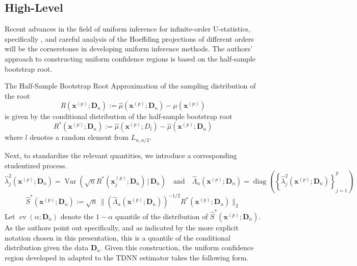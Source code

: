 \documentclass[letterpaper,10pt]{article}
\numberwithin{equation}{section}
\numberwithin{theorem}{section}
\numberwithin{remark}{section}
\numberwithin{example}{section}
\theoremstyle{definition}
\renewcommand{\hat}{\widehat}
\newcommand{\1}{\mathbb{1}}
\begin{document}
\subsection{High-Level}
Recent advances in the field of uniform inference for infinite-order U-statistics, specifically \citet{ritzwoller_uniform_2024}, and careful analysis of the Hoeffding projections of different orders will be the cornerstones in developing uniform inference methods.
The authors' approach to constructing uniform confidence regions is based on the half-sample bootstrap root.

\vspace{0.5cm}
\begin{definition}
	The Half-Sample Bootstrap Root Approximation of the sampling distribution of the root
	\begin{equation}
		R\left(\mathbf{x}^{(p)}; \mathbf{D}_n\right)
		:= \hat{\mu}\left(\mathbf{x}^{(p)}; \mathbf{D}_n\right) - \mu(\mathbf{x}^{(p)})
	\end{equation}
	is given by the conditional distribution of the half-sample bootstrap root
	\begin{equation}
		R^{*}\left(\mathbf{x}^{(p)}; \mathbf{D}_n\right)
		:= \hat{\mu}\left(\mathbf{x}^{(p)}; D_l\right) - \hat{\mu}\left(\mathbf{x}^{(p)}; \mathbf{D}_n\right)
	\end{equation}
	where $l$ denotes a random element from $L_{n, n/2}$.
\end{definition}
Next, to standardize the relevant quantities, we introduce a corresponding studentized process.
\begin{equation}
	\hat{\lambda}_{j}^{2}\left(\mathbf{x}^{(p)}; \mathbf{D}_n\right) = \operatorname{Var}\left(\sqrt{n} R^{*}(\mathbf{x}^{(p)}_{j}; \mathbf{D}_n) \, | \, \mathbf{D}_n\right)
	\quad \text{and} \quad
	\hat{\Lambda}_n\left(\mathbf{x}^{(p)}; \mathbf{D}_n\right) = \operatorname{diag}\left(\left\{\hat{\lambda}_{j}^{2}\left(\mathbf{x}^{(p)}; \mathbf{D}_n\right)\right\}_{j = 1}^{p}\right)
\end{equation}
\begin{equation}
	\hat{S}^{*}\left(\mathbf{x}^{(p)}; \mathbf{D}_n\right)
	:= \sqrt{n} \, \Big\| \left(\hat{\Lambda}_n\left(\mathbf{x}^{(p)}; \mathbf{D}_n\right)\right)^{-1/2} R^{*}\left(\mathbf{x}^{(p)}; \mathbf{D}_n\right)\Big\|_{2}
\end{equation}
Let $\operatorname{cv}\left(\alpha; \mathbf{D}_n\right)$ denote the $1-\alpha$ quantile of the distribution of $\hat{S}^{*}\left(\mathbf{x}^{(p)}; \mathbf{D}_n\right)$.
As the authors point out specifically, and as indicated by the more explicit notation chosen in this presentation, this is a quantile of the conditional distribution given the data $\mathbf{D}_n$.
Given this construction, the uniform confidence region developed in \citet{ritzwoller_uniform_2024} adapted to the TDNN estimator takes the following form.
\end{document}
